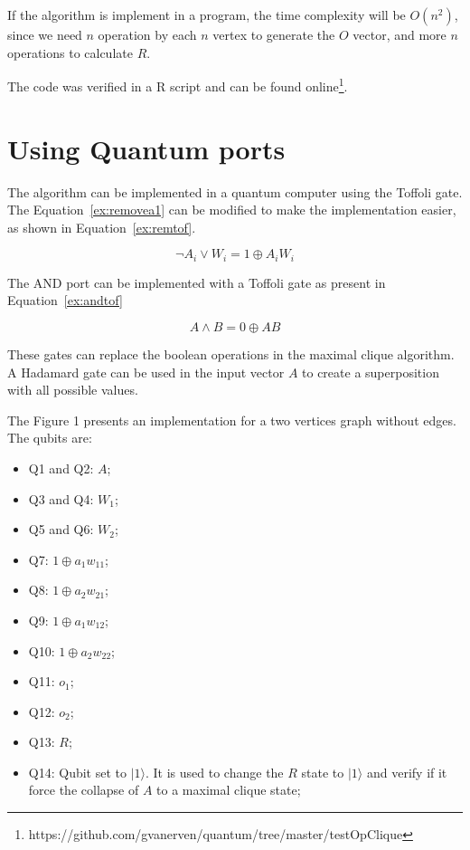 \documentclass[a4paper,12pt]{article}
\begin{document}
If the algorithm is implement in a program, the time complexity will be $O(n^2)$, since we need $n$ operation by each $n$ vertex to generate the $O$ vector, and more $n$ operations to calculate $R$.

The code was verified in a R script and can be found online\footnote{https://github.com/gvanerven/quantum/tree/master/testOpClique}.
\section{Using Quantum ports}

The algorithm can be implemented in a quantum computer using the Toffoli gate. The Equation~\ref{ex:removea1} can be modified to make the implementation easier, as shown in Equation~\ref{ex:remtof}.

\begin{equation}
	\neg A_i \lor W_i = 1 \oplus A_i W_i \label{ex:remtof}
\end{equation}

The AND port can be implemented with a Toffoli gate as present in Equation~\ref{ex:andtof} 

\begin{equation}
	A \land B = 0 \oplus AB \label{ex:andtof}
\end{equation}

These gates can replace the boolean operations in the maximal clique algorithm. A Hadamard gate can be used in the input vector $A$ to create a superposition with all possible values.

The Figure 1 presents an implementation for a two vertices graph without edges. The qubits are:

\begin{itemize}
	\item Q1 and Q2: $A$;
	\item Q3 and Q4: $W_1$;
	\item Q5 and Q6: $W_2$;
	\item Q7: $1 \oplus a_1 w_{11}$;
	\item Q8: $1 \oplus a_2 w_{21}$;
	\item Q9: $1 \oplus a_1 w_{12}$;
	\item Q10: $1 \oplus a_2 w_{22}$;
	\item Q11: $o_{1}$;
	\item Q12: $o_{2}$;
	\item Q13: $R$;
	\item Q14: Qubit set to $|1\rangle$. It is used to change the $R$ state to $|1\rangle$ and verify if it force the collapse of $A$ to a maximal clique state; 
\end{itemize}
\end{document}
